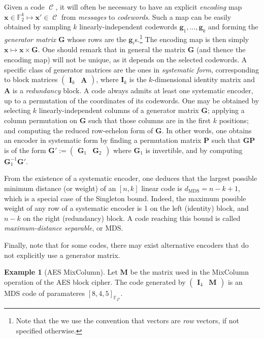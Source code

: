\documentclass[11pt,a4paper]{article}
\theoremstyle{definition}
\newtheorem{example}{Example}
\DeclareMathOperator\code{\mathcal{C}}
\newcommand\ftwo{\mathbb{F}_{2}}
\begin{document}
Given a code $\code$, it will often be necessary to have an explicit \emph{encoding} map $\bm{x} \in \ftwo^k \mapsto \bm{x}' \in \code$ from \emph{messages} to \emph{codewords}. Such a map can be easily obtained by sampling $k$ linearly-independent codewords
$\bm{g}_{1},\ldots,\bm{g}_{k}$ and forming the \emph{generator matrix} $\bm{G}$ whose rows are the $\bm{g}_i$s.\footnote{Note that the we use the convention that vectors are \emph{row} vectors, if not specified otherwise.} The encoding map is then
simply $\bm{x} \mapsto \bm{x}\times\bm{G}$. One should remark that in general the matrix $\bm{G}$ (and thence the encoding map) will not be unique, as it depends on the selected codewords. A specific class of generator matrices are the ones in
\emph{systematic form}, corresponding to block matrices $\begin{pmatrix}\bm{I}_k & \bm{A}\end{pmatrix}$, where $\bm{I}_k$ is the $k$-dimensional identity matrix and $\bm{A}$ is a \emph{redundancy} block. A code always admits at least one systematic encoder, up to a permutation of the coordinates
of its codewords. One may be obtained by selecting $k$ linearly-independent columns of a generator matrix $\bm{G}$; applying a column permutation on $\bm{G}$ such that those columns are in the first $k$ positions; and computing the reduced row-echelon form
of $\bm{G}$. In other words, one obtains an encoder in systematic form by finding a permutation matrix $\bm{P}$ such that $\bm{GP}$ is of the form $\bm{G}' := \begin{pmatrix}\bm{G}_1 & \bm{G}_2\end{pmatrix}$ where $\bm{G}_1$ is invertible, and by computing
$\bm{G}_1^{-1}\bm{G}'$.

From the existence of a systematic encoder, one deduces that the largest possible minimum distance (or weight) of an $[n,k]$ linear code is $d_{\text{MDS}} = n-k+1$, which is a special case of the Singleton bound. Indeed, the maximum possible
weight of any row of a systematic encoder is 1 on the left (identity) block, and $n-k$ on the right (redundancy) block. A code reaching this bound is called \emph{maximum-distance separable}, or MDS.

Finally, note that for some codes, there may exist alternative encoders
that do not explicitly use a generator matrix.

\begin{example}[AES MixColumn]
	Let $\bm{M}$ be the matrix used in the MixColumn operation of the AES block cipher. The code generated by $\begin{pmatrix}\bm{I}_4 & \bm{M}\end{pmatrix}$ is an MDS code of paramateres $[8,4,5]_{\mathbb{F}_{2^8}}$.
\end{example}
\end{document}
